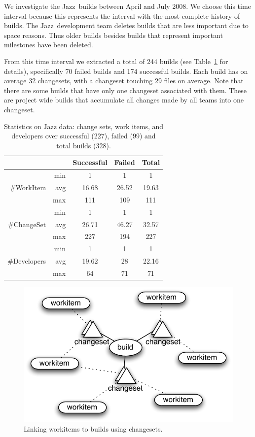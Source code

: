 \documentclass{sig-alternate}
\begin{document}
We investigate the Jazz\texttrademark\ builds between April and July 2008.
We choose this time interval because this represents the interval with the most complete history of builds.
The Jazz\texttrademark\ development team deletes builds that are less important due to space reasons.
Thus older builds besides builds that represent important milestones have been deleted.

From this time interval we extracted a total of 244 builds (see
Table~\ref{tab:jazzbuildinfo} for details), specifically 70 failed builds and 174
successful builds. Each build has on average 32 changesets, with a changeset
touching 29 files on average. Note that there are some builds that have only one changeset associated
with them. These are project wide builds that accumulate all changes made by
all teams into one changeset.



\begin{table}[t]
\centering
\begin{tabular}{rrccc}
\toprule
& & Successful & Failed & Total\\
\midrule
&min &1&1&1\\
\#WorkItem & avg  & 16.68&26.52&19.63\\
& max & 111&109&111\\
\midrule
& min & 1&1&1\\
\#ChangeSet & avg  & 26.71&46.27&32.57\\
& max & 227&194&227\\
\midrule
& min & 1&1&1\\
\#Developers & avg  & 19.62&28&22.16\\
& max &64&71&71\\
\bottomrule
\end{tabular}
\caption{Statistics on Jazz data: change sets, work items, 
and developers over successful (227), failed (99) and total builds (328).}
\label{tab:jazzbuildinfo}
\end{table}

\begin{figure}[b]
\centering
\includegraphics[width=.8\columnwidth]{buildworkitem}
\caption{Linking workitems to builds using changesets.}
\label{fig:buildtoworkitem}
\end{figure}
\end{document}
